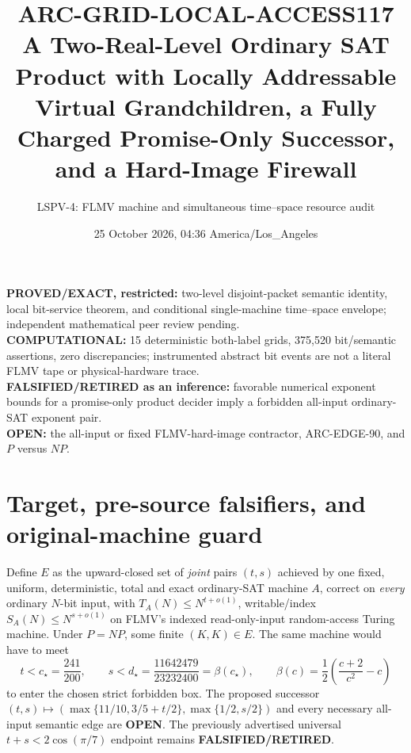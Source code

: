 \documentclass[11pt]{article}
\title{ARC-GRID-LOCAL-ACCESS117\\
\large A Two-Real-Level Ordinary SAT Product with Locally Addressable\\
Virtual Grandchildren, a Fully Charged Promise-Only Successor,\\
and a Hard-Image Firewall}
\author{LSPV-4: FLMV machine and simultaneous time--space resource audit}
\date{25 October 2026, 04:36 America/Los\_Angeles}
\newcommand{\OPEN}{\textbf{OPEN}}
\begin{document}
\maketitle
\begin{center}
\textbf{PROVED/EXACT, restricted:} two-level disjoint-packet semantic identity,
local bit-service theorem, and conditional single-machine time--space envelope;
independent mathematical peer review pending.\\
\textbf{COMPUTATIONAL:} 15 deterministic both-label grids, 375,520
bit/semantic assertions, zero discrepancies; instrumented abstract bit events
are not a literal FLMV tape or physical-hardware trace.\\
\textbf{FALSIFIED/RETIRED as an inference:} favorable numerical exponent
bounds for a promise-only product decider imply a forbidden all-input
ordinary-SAT exponent pair.\\
\textbf{OPEN:} the all-input or fixed FLMV-hard-image contractor,
ARC-EDGE-90, and \(P\) versus \(NP\).
\end{center}

\section{Target, pre-source falsifiers, and original-machine guard}
Define \(E\) as the upward-closed set of \emph{joint} pairs \((t,s)\)
achieved by one fixed, uniform, deterministic, total and exact
ordinary-SAT machine \(A\), correct on \emph{every} ordinary \(N\)-bit input,
with \(T_A(N)\le N^{t+o(1)}\), writable/index
\(S_A(N)\le N^{s+o(1)}\) on FLMV's indexed read-only-input
random-access Turing machine. Under \(P=NP\), some finite
\((K,K)\in E\).
The same machine would have to meet
\[
t<c_\star=\frac{241}{200},\qquad
s<d_\star=\frac{11642479}{23232400}=\beta(c_\star),\qquad
\beta(c)=\frac12\left(\frac{c+2}{c^2}-c\right)
\]
to enter the chosen strict forbidden box. The proposed successor
\((t,s)\mapsto(\max\{11/10,3/5+t/2\},\max\{1/2,s/2\})\)
and every necessary all-input semantic edge are \OPEN.
The previously advertised universal
\(t+s<2\cos(\pi/7)\) endpoint remains \textbf{FALSIFIED/RETIRED}.
\end{document}

